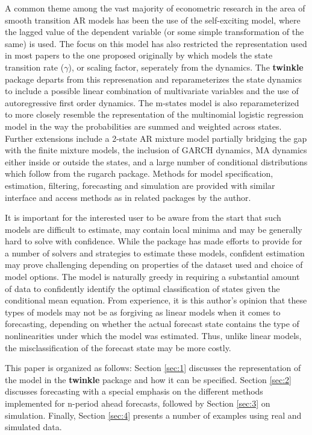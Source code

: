 A common theme among the vast majority of econometric research in the area of
smooth transition AR models has been the use of the self-exciting model,
where the lagged value of the dependent variable (or some simple transformation 
of the same) is used. The focus on this model has also restricted the
representation used in most papers to the one proposed originally by
\cite{Terasvirta1994} which models the state transition rate ($\gamma$), or
scaling factor, seperately from the dynamics. The \textbf{twinkle} package
departs from this represenation and reparameterizes the state
dynamics to include a possible linear combination of multivariate
variables and the use of autoregressive first order dynamics. The m-states model
is also reparameterized to more closely resemble the representation of the
multinomial logistic regression model in the way the probabilities are summed
and weighted across states. Further extensions include a 2-state AR mixture
model partially bridging the gap with the finite mixture models, the inclusion of 
GARCH dynamics, MA dynamics either inside or outside the states, and a large
number of conditional distributions which follow from the rugarch package. Methods 
for model specification, estimation, filtering, forecasting and simulation are
provided with similar interface and access methods as in related packages by the author. 

It is important for the interested user to be aware from the start that such
models are difficult to estimate, may contain local minima and may be generally
hard to solve with confidence. While the package has made efforts to provide for a 
number of solvers and strategies to estimate these models, confident estimation
may prove challenging depending on properties of the dataset used and choice of 
model options. The model is naturally greedy in requiring a substantial amount of data to
confidently identify the optimal classification of states given the conditional
mean equation. From experience, it is this author's opinion that these types of
models may not be as forgiving as linear models when it comes to forecasting, 
depending on whether the actual forecast state contains the type of
nonlinearities under which the model was estimated. Thus, unlike linear
models, the misclassification of the forecast state may be more costly.

This paper is organized as follows: Section \ref{sec:1} discusses the
representation of the model in the \textbf{twinkle} package and how it can be
specified. Section \ref{sec:2} discusses forecasting with a special emphasis on
the different methods implemented for n-period ahead forecasts, followed by 
Section \ref{sec:3} on simulation. Finally, Section \ref{sec:4} presents a 
number of examples using real and simulated data.

